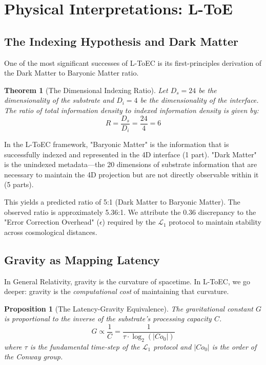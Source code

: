 \documentclass[11pt,onecolumn]{article}
\newcommand{\protocol}{\mathcal{L}_1}
\newcommand{\conway}{Co_0}
\newtheorem{theorem}{Theorem}
\newtheorem{proposition}{Proposition}
\begin{document}
\section{Physical Interpretations: L-ToE}

\subsection{The Indexing Hypothesis and Dark Matter}
One of the most significant successes of L-ToEC is its first-principles derivation of the Dark Matter to Baryonic Matter ratio.

\begin{theorem}[The Dimensional Indexing Ratio]
Let $D_s = 24$ be the dimensionality of the substrate and $D_i = 4$ be the dimensionality of the interface. The ratio of total information density to indexed information density is given by:
\begin{equation}
R = \frac{D_s}{D_i} = \frac{24}{4} = 6
\end{equation}
\end{theorem}

In the L-ToEC framework, "Baryonic Matter" is the information that is successfully indexed and represented in the 4D interface (1 part). "Dark Matter" is the unindexed metadata—the 20 dimensions of substrate information that are necessary to maintain the 4D projection but are not directly observable within it (5 parts).

This yields a predicted ratio of 5:1 (Dark Matter to Baryonic Matter). The observed ratio is approximately 5.36:1. We attribute the 0.36 discrepancy to the "Error Correction Overhead" ($\epsilon$) required by the $\protocol$ protocol to maintain stability across cosmological distances.

\subsection{Gravity as Mapping Latency}
In General Relativity, gravity is the curvature of spacetime. In L-ToEC, we go deeper: gravity is the \textit{computational cost} of maintaining that curvature.

\begin{proposition}[The Latency-Gravity Equivalence]
The gravitational constant $G$ is proportional to the inverse of the substrate's processing capacity $C$.
\begin{equation}
G \propto \frac{1}{C} = \frac{1}{\tau \cdot \log_2(|\conway|)}
\end{equation}
where $\tau$ is the fundamental time-step of the $\protocol$ protocol and $|\conway|$ is the order of the Conway group.
\end{proposition}
\end{document}
